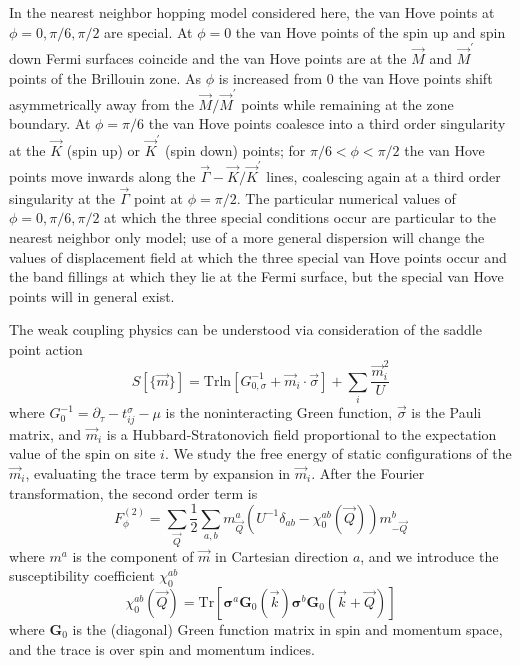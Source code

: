 \documentclass[%
reprint,
superscriptaddress,
twocolumn,
 amsmath,amssymb,
 aps,
 prb,
]{revtex4-2}
\begin{document}
In the nearest neighbor hopping model considered here, the van Hove points at $\phi=0,\pi/6,\pi/2$ are special. At $\phi=0$ the van Hove points of the spin up and spin down Fermi surfaces coincide and the van Hove points are at the $\vec{M}$ and $\vec{M}^\prime$ points of the Brillouin zone. As $\phi$ is increased from $0$ the van Hove points shift asymmetrically away from the $\vec{M}/\vec{M}^\prime$ points while remaining at the zone boundary. At $\phi=\pi/6$ the van Hove points coalesce into a third order singularity at the $\vec{K}$ (spin up) or $\vec{K}^\prime$ (spin down) points; for $\pi/6<\phi<\pi/2$ the van Hove points move inwards along the $\vec{\Gamma}-\vec{K}/\vec{K}^\prime$ lines, coalescing again at a third order singularity at the $\vec{\Gamma}$ point at $\phi=\pi/2$. The particular numerical values of $\phi=0,\pi/6,\pi/2$ at which the three special conditions occur are particular to the nearest neighbor only model; use of a more general dispersion will change the  values of displacement field  at which the three special van Hove points occur and the band fillings  at which they lie at the Fermi surface, but the special van Hove points will in general exist.


The weak coupling physics can be understood via consideration of the saddle point action
\begin{equation}
    S[\{\vec{m}\}]=\text{Trln} \left[G_{0,\sigma}^{-1}+\vec{m}_i\cdot\vec{\sigma}\right]+\sum_i\frac{\vec{m}_i^2}{U}
    \label{action}
\end{equation}
where $G_0^{-1}=\partial_\tau-t_{ij}^\sigma-\mu$ is the noninteracting Green function, $\vec{\sigma}$ is the Pauli matrix, and $\vec{m}_i$ is a Hubbard-Stratonovich field proportional to the expectation value of the spin on site $i$. We study the free energy of static configurations of the $\vec{m}_i$, evaluating the trace term by expansion in $\vec{m}_i$. After the Fourier transformation, the second order term is
\begin{equation}
    F^{(2)}_\phi=\sum_{\vec{Q}}\frac{1}{2}\sum_{a,b}m^a_{\vec{Q}}\left(U^{-1}\delta_{ab}-\chi^{ab}_0(\vec{Q})\right)m^b_{-\vec{Q}}
    \label{eq:S2}
\end{equation}
where $m^a$ is the component of $\vec{m}$ in Cartesian direction $a$, and we introduce the susceptibility coefficient $\chi^{ab}_0$ 
\begin{equation}
    \chi^{ab}_0(\vec Q)=\text{Tr}\left[\bm{\sigma}^a\mathbf{G}_0(\vec k)\bm{\sigma}^b\mathbf{G}_0(\vec k+ \vec Q)\right]
\end{equation}
where $\mathbf{G}_0$ is the (diagonal) Green function matrix in spin and momentum space, and the trace is over spin and momentum indices.
\end{document}

